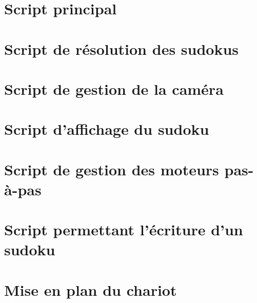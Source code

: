 \printbibliography
\nocite{*}
\appendix

\begin{changemargin}{-2cm}{-4cm}

\label{Scripts}
\chapter*{Script principal}
\label{main}

\chapter*{Script de résolution des sudokus}
\label{resolution}

\chapter*{Script de gestion de la caméra}
\label{camera}

\chapter*{Script d'affichage du sudoku}
\label{display}

\chapter*{Script de gestion des moteurs pas-à-pas}
\label{step_motor}

\chapter*{Script permettant l'écriture d'un sudoku}
\label{write}


\chapter*{Mise en plan du chariot}


\end{changemargin}
